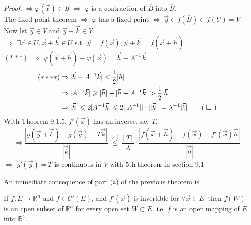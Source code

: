 \begin{proof}
       $ \Rightarrow \varphi(\vec{x})\in B  $ $ \Rightarrow   $  $ \varphi   $ is a contraction of  $ \overline{B} $ into  $ \overline{B} $.\\
       The fixed point theorem $ \Rightarrow  $  $ \varphi  $ has a fixed point  $ \Rightarrow  $  $ \vec{y}\in f(\overline{B})\subset f(U)=V $ \\
       Now let  $ \vec{y }\in V  $ and  $ \vec{y}+\vec{k}\in V  $.\\
        $ \Rightarrow  $  $ \exists \vec{x}\in U,\vec{x}+\vec{h}\in U  $ s.t.  $ \vec{y}=f(\vec{x}),\vec{y}+\vec{k}=f(\vec{x}+\vec{h}) $\\
          $ (\ast\ast\ast) $  $ \Rightarrow  $  $ \varphi(\vec{x}+\vec{h})-\varphi(\vec{x})=\vec{h}-A^{-1}\vec{k} $\\
          \begin{align}
                (\ast\ast\ast\ast)&\Rightarrow |\vec{h}-A^{-1}\vec{k}|<\frac{1 }{2 }|\vec{h}|\notag\\
                &\Rightarrow |A^{-1}\vec{k}|\geqslant |\vec{h}|-|\vec{h}-A^{-1}\vec{k}|>\frac{1 }{2 }|\vec{h}|\notag\\
                &\Rightarrow |\vec{h}| \leqslant 2|A^{-1}\vec{k}| \leqslant 2||A^{-1}||\cdot||\vec{k}||=\lambda^{-1}|\vec{k}|\tag{ $ \square $ }
          \end{align}  
        With Theorem 9.1.5,  $ f'(\vec{x}) $ has an inverse, say  $ T $.
        \begin{equation}
            \Rightarrow \dfrac{|g(\vec{y}+\vec{k})-g(\vec{y})-T\vec{k}|}{|\vec{k}|}\overset{(\square)}{\leqslant}\dfrac{||T||}{\lambda}\cdot\dfrac{|f(\vec{x}+\vec{h})-f(\vec{x})-f'(\vec{x})\vec{h}|}{|\vec{h}|}\tag{ $ \square\square $ }
        \end{equation}  
         $ \Rightarrow  $  $ g'(\vec{y})=T $ is continuous in  $ V  $ with 5th theorem in section 9.1. 
\end{proof}
An immediate consequence of part (a) of the previous theorem is 
\begin{theorem}
    If  $ f:E\rightarrow \mathbb{R}^n $ and  $ f\in \mathscr{C}'(E) $, and  $ f'(\vec{x})  $ is invertible for  $ \forall \vec{x }\in E  $, then  $ f(W ) $ is an open subset of  $ \mathbb{R}^n   $ for every open set  $ W\subset E $. i.e.  $ f  $ is an \underline{open mapping} of  $ E $ into  $ \mathbb{R}^n $.     
\end{theorem}
